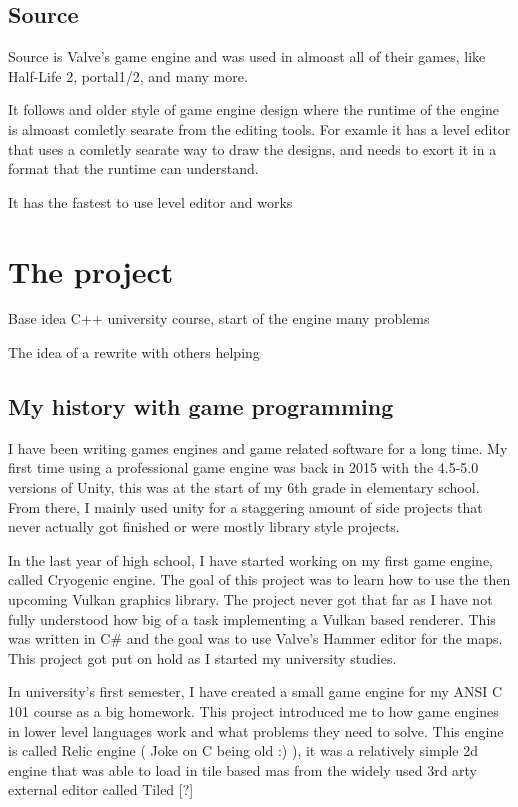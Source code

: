 \subsection{Source}

Source is Valve's game engine and was used in almoast all of their games, like Half-Life 2, portal1/2, and many more.

It follows and older style of game engine design where the runtime of the engine is almoast comletly searate from the editing tools. For examle it has a level editor that uses a comletly searate way to draw the designs, and needs to exort it in a format that the runtime can understand.

It has the fastest to use level editor and works


\section{The project}

Base idea
C++ university course, start of the engine
many problems

The idea of a rewrite with others helping

\subsection{My history with game programming}
I have been writing games engines and game related software for a long time.
My first time using a professional game engine was back in 2015 with the 4.5-5.0 versions of Unity, this was at the start of my 6th grade in elementary school. From there, I mainly used unity for a staggering amount of side projects that never actually got finished or were mostly library style projects.

In the last year of high school, I have started working on my first game engine, called Cryogenic engine.
The goal of this project was to learn how to use the then upcoming Vulkan graphics library.
The project never got that far as I have not fully understood how big of a task implementing a Vulkan based renderer.
This was written in C\# and the goal was to use Valve's Hammer editor for the maps.
This project got put on hold as I started my university studies.

In university's first semester, I have created a small game engine for my ANSI C 101 course as a big homework.
This project introduced me to how game engines in lower level languages work and what problems they need to solve.
This engine is called Relic engine ( Joke on C being old :) ),
it was a relatively simple 2d engine that was able to load in tile based mas from the widely used 3rd arty external editor called Tiled [?]

